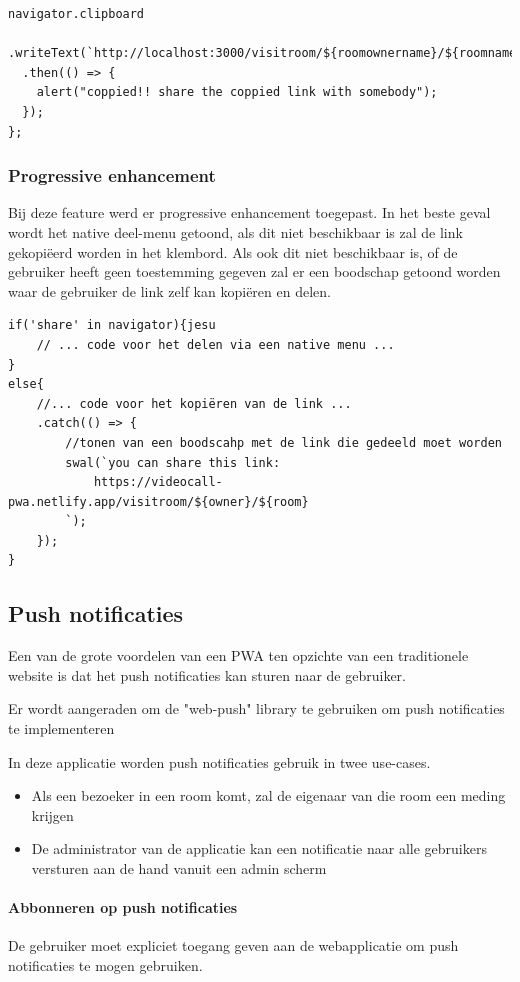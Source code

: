 \begin{lstlisting}
navigator.clipboard
  .writeText(`http://localhost:3000/visitroom/${roomownername}/${roomname}`)
  .then(() => {
    alert("coppied!! share the coppied link with somebody");
  });
};
\end{lstlisting}

		\subsubsection{Progressive enhancement}

			Bij deze feature werd er progressive enhancement toegepast. 
			In het beste geval wordt het native deel-menu getoond, als dit niet beschikbaar is zal de link gekopiëerd worden in het klembord.
			Als ook dit niet beschikbaar is, of de gebruiker heeft geen toestemming gegeven zal er een boodschap getoond worden waar de gebruiker de link zelf kan kopiëren en delen.
		
\begin{lstlisting}
if('share' in navigator){jesu
	// ... code voor het delen via een native menu ...
}
else{
	//... code voor het kopiëren van de link ...
	.catch(() => {
		//tonen van een boodscahp met de link die gedeeld moet worden
		swal(`you can share this link:
			https://videocall-pwa.netlify.app/visitroom/${owner}/${room}
		`);
	});
}
\end{lstlisting}


	\subsection{Push notificaties}
	
		Een van de grote voordelen van een PWA ten opzichte van een traditionele website is dat het push notificaties kan sturen naar de gebruiker.
		
		Er wordt aangeraden om de "web-push" library te gebruiken om push notificaties te implementeren
		
		In deze applicatie worden push notificaties gebruik in twee use-cases. 
		\begin{itemize}
			\item 	Als een bezoeker in een room komt, zal de eigenaar van die room een meding krijgen
			\item 	De administrator van de applicatie kan een notificatie naar alle gebruikers versturen aan de hand vanuit een admin scherm
		\end{itemize}	
		
		\paragraph{Abbonneren op push notificaties}
			 De gebruiker moet expliciet toegang geven aan de webapplicatie om push notificaties te mogen gebruiken.
			 
